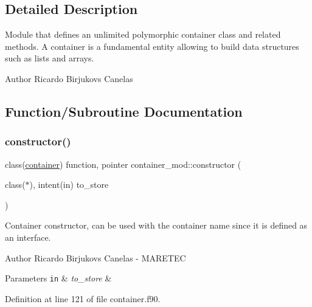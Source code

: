 \subsection{Detailed Description}
Module that defines an unlimited polymorphic container class and related methods. A container is a fundamental entity allowing to build data structures such as lists and arrays. 

\begin{DoxyAuthor}{Author}
Ricardo Birjukovs Canelas 
\end{DoxyAuthor}


\subsection{Function/\+Subroutine Documentation}
\mbox{\label{namespacecontainer__mod_a6262df4ff34024d566cf8261dc20a248}} 
\subsubsection{\texorpdfstring{constructor()}{constructor()}}
{\footnotesize\ttfamily class(\mbox{\hyperlink{structcontainer__mod_1_1container}{container}}) function, pointer container\+\_\+mod\+::constructor (\begin{DoxyParamCaption}\item[{class($\ast$), intent(in)}]{to\+\_\+store }\end{DoxyParamCaption})\hspace{0.3cm}{\ttfamily [private]}}



Container constructor, can be used with the \textquotesingle{}container\textquotesingle{} name since it is defined as an interface. 

\begin{DoxyAuthor}{Author}
Ricardo Birjukovs Canelas -\/ M\+A\+R\+E\+T\+EC 
\end{DoxyAuthor}

\begin{DoxyParams}[1]{Parameters}
\mbox{\tt in}  & {\em to\+\_\+store} & \\
\hline
\end{DoxyParams}


Definition at line 121 of file container.\+f90.


